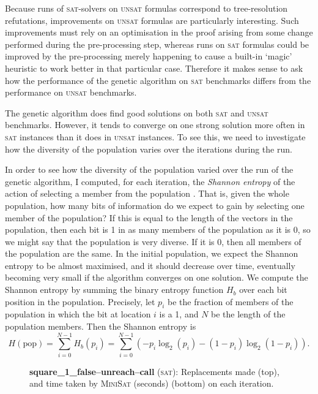 \documentclass[proof,pdftex,11pt,a4,titlepage]{article}
\newcommand{\sat}{\textsc{sat}}
\newcommand{\unsat}{\textsc{unsat}}
\begin{document}
Because runs of \sat{}-solvers on \unsat{} formulas correspond to tree-resolution refutations, improvements on \unsat{} formulas are particularly interesting. Such improvements must rely on an optimisation in the proof arising from some change performed during the pre-processing step, whereas runs on \sat{} formulas could be improved by the pre-processing merely happening to cause a built-in `magic' heuristic to work better in that particular case. Therefore it makes sense to ask how the performance of the genetic algorithm on \sat{} benchmarks differs from the performance on \unsat{} benchmarks.

The genetic algorithm does find good solutions on both \sat{} and \unsat{} benchmarks. However, it tends to converge on one strong solution more often in \sat{} instances than it does in \unsat{} instances. To see this, we need to investigate how the diversity of the population varies over the iterations during the run.

In order to see how the diversity of the population varied over the run of the genetic algorithm, I computed, for each iteration, the \emph{Shannon entropy} of the action of selecting a member from the population \cite{Shannon:1948}. That is, given the whole population, how many bits of information do we expect to gain by selecting one member of the population? If this is equal to the length of the vectors in the population, then each bit is 1 in as many members of the population as it is 0, so we might say that the population is very diverse. If it is 0, then all members of the population are the same. In the initial population, we expect the Shannon entropy to be almost maximised, and it should decrease over time, eventually becoming very small if the algorithm converges on one solution. We compute the Shannon entropy by summing the binary entropy function $H_b$ over each bit position in the population. Precisely, let $p_i$ be the fraction of members of the population in which the bit at location $i$ is a 1, and $N$ be the length of the population members. Then the Shannon entropy is
\[H(\mathrm{pop}) = \sum_{i=0}^{N-1} H_b(p_i) = \sum_{i=0}^{N-1} \left( -p_i\log_2(p_i) - (1-p_i)\log_2(1-p_i) \right).\]

\begin{figure}[p]
  

  \vspace{1cm}

  
  \caption{{\bf square\_1\_false--unreach--call} (\sat{}): Replacements made (top), and time taken by \textsc{MiniSat} (seconds) (bottom) on each iteration.}
  \label{fig:square_1_rep_dist}
\end{figure}
\end{document}
